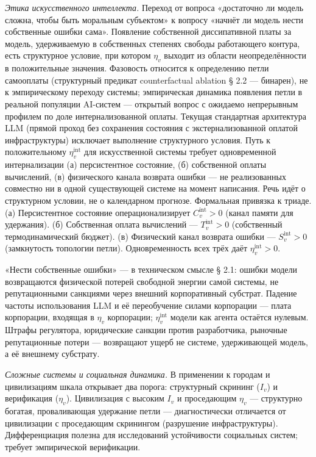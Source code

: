 \documentclass[pdflatex,sn-mathphys-ay]{sn-jnl}
\begin{document}
\emph{Этика искусственного интеллекта.} Переход от вопроса «достаточно ли модель сложна, чтобы быть моральным субъектом» к вопросу «начнёт ли модель нести собственные ошибки сама». Появление собственной диссипативной платы за модель, удерживаемую в собственных степенях свободы работающего контура, есть структурное условие, при котором \(\eta_v\) выходит из области неопределённости в положительные значения. Фазовость относится к определению петли самооплаты (структурный предикат counterfactual ablation § 2.2 --- бинарен), не к эмпирическому переходу системы; эмпирическая динамика появления петли в реальной популяции AI-систем --- открытый вопрос с ожидаемо непрерывным профилем по доле интернализованной оплаты. Текущая стандартная архитектура LLM (прямой проход без сохранения состояния с экстернализованной оплатой инфраструктуры) исключает выполнение структурного условия. Путь к положительному \(\eta_v^{\text{int}}\) для искусственной системы требует одновременной интернализации (а) персистентное состояние, (б) собственной оплаты вычислений, (в) физического канала возврата ошибки --- не реализованных совместно ни в одной существующей системе на момент написания. Речь идёт о структурном условии, не о календарном прогнозе. Формальная привязка к триаде. (а) Персистентное состояние операционализирует \(C_v^{\text{int}} > 0\) (канал памяти для удержания). (б) Собственная оплата вычислений --- \(T_v^{\text{int}} > 0\) (собственный термодинамический бюджет). (в) Физический канал возврата ошибки --- \(S_v^{\text{int}} > 0\) (замкнутость топологии петли). Одновременность всех трёх даёт \(\eta_v^{\text{int}} > 0\).

«Нести собственные ошибки» --- в техническом смысле § 2.1: ошибки модели возвращаются физической потерей свободной энергии самой системы, не репутационными санкциями через внешний корпоративный субстрат. Падение частоты использования LLM и её переобучение силами корпорации --- плата корпорации, входящая в \(\eta_v\) корпорации; \(\eta_v^{\text{int}}\) модели как агента остаётся нулевым. Штрафы регулятора, юридические санкции против разработчика, рыночные репутационные потери --- возвращают ущерб не системе, удерживающей модель, а её внешнему субстрату.

\emph{Сложные системы и социальная динамика.} В применении к городам и цивилизациям шкала открывает два порога: структурный скрининг (\(I_v\)) и верификация (\(\eta_v\)). Цивилизация с высоким \(I_v\) и проседающим \(\eta_v\) --- структурно богатая, проваливающая удержание петли --- диагностически отличается от цивилизации с проседающим скринингом (разрушение инфраструктуры). Дифференциация полезна для исследований устойчивости социальных систем; требует эмпирической верификации.
\end{document}
